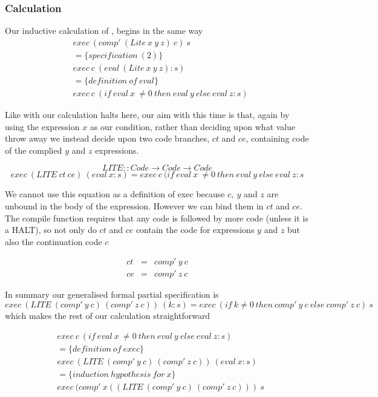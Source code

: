 \documentclass {article}
\begin{document}
\subsubsection{Calculation}

Our inductive calculation of \lite ,
begins in the same way
\begin{align*}
	&exec\ (comp'\ (Lite\ x\ y\ z)\ c)\ s \\
	&= \{specification\ (2) \} \\
	&exec\ c\ (eval\ (Lite\ x\ y\ z) : s) \\
	&= \{definition\ of\ eval\} \\
	&exec\ c\ (if\ eval\ x\ \not= 0 \ then\ eval\ y\ else\ eval\ z : s)
\end{align*}

Like with \ite our calculation halts here,
our aim with this time is that, again by using
the expression $x$ as our condition,
rather than deciding upon what value throw away
we instead decide upon two code branches, $ct$ and $ce$,
containing code of the complied $y$ and $z$ expressions.

	\[ LITE :: Code \rightarrow Code \rightarrow Code \]
	\[ exec\ (LITE\ ct\ ce)\ (eval\ x:s) 
	= exec\ c\ (if\ eval\ x\ \not= 0 \ then\ eval\ y\ else\ eval\ z : s \]

We cannot use this equation as a definition of exec 
because $c, \ y$ and $z$ are unbound in the 
body of the expression\cite[page 10]{bandh}.
However we can bind them in $ct$ and $ce$.
The compile function \compp requires that any code is followed by
more code (unless it is a HALT),
so not only do  $ct$ and $ce$ contain the code for expressions
 $y$ and $z$ but also the continuation code $c$

\begin{eqnarray*}
	ct &=& comp'\ y\ c \\
	ce &=& comp'\ z\ c
\end{eqnarray*}

In summary our generalised formal partial specification is
\begin{equation*}
	exec\ (LITE\ (comp'\ y\ c)\ (comp'\ z\ c) )\ (k:s) 
= exec\ (if\ k \not= 0\ then\ comp'\ y\ c\ else\ comp'\ z\ c)\ s 
\end{equation*}
which makes the rest of our calculation straightforward

\begin{align*}
	&exec\ c\ (if\ eval\ x\ \not= 0 \ then\ eval\ y\ else\ eval\ z : s) \\
	&= \{definition\ of\ exec\} \\
	&exec\ (LITE\ (comp'\ y\ c)\ (comp'\ z\ c) )\ (eval\ x : s) \\
	&= \{induction\ hypothesis\ for\ x\} \\
	&exec\ (comp'\ x ((LITE\ (comp'\ y\ c)\ (comp'\ z\ c)))\ s
\end{align*}
\end{document}
